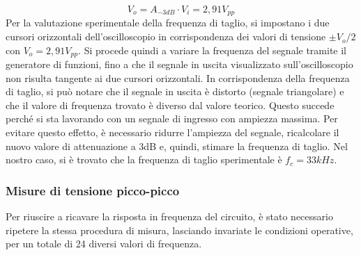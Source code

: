 \[V_o=A_{-3dB} \cdot V_i=2,91V_{pp}\]
Per la valutazione sperimentale della frequenza di taglio, si impostano i due cursori orizzontali dell’oscilloscopio in corrispondenza dei valori di tensione $\pm V_o/2$ con $V_o = 2,91V_{pp}$. Si procede quindi a variare la frequenza del segnale tramite il generatore di funzioni, fino a che il segnale in uscita visualizzato sull’oscilloscopio non risulta tangente ai due cursori orizzontali. In corrispondenza della frequenza di taglio, si può notare che il segnale in uscita è distorto (segnale triangolare) e che il valore di frequenza trovato è diverso dal valore teorico. Questo succede perché si sta lavorando con un segnale di ingresso con ampiezza massima. Per evitare questo effetto, è necessario ridurre l’ampiezza del segnale, ricalcolare il nuovo valore di attenuazione a 3dB e, quindi, stimare la frequenza di taglio.
Nel nostro caso, si è trovato che la frequenza di taglio sperimentale è \(f_c=33kHz\).
\clearpage
\subsubsection{Misure di tensione picco-picco}

Per riuscire a ricavare la risposta in frequenza del circuito, è stato necessario ripetere la stessa procedura di misura, lasciando invariate le condizioni operative, per un totale di 24 diversi valori di frequenza.

